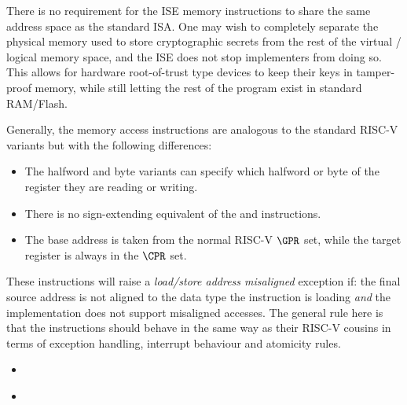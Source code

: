 There is no requirement for the ISE memory instructions to share the same
address space as the standard ISA. One may wish to completely separate
the physical memory used to store cryptographic secrets from the rest of
the virtual / logical memory space, and the ISE does not stop implementers
from doing so. This allows for hardware root-of-trust type devices to keep
their keys in tamper-proof memory, while still letting the rest of the
program exist in standard RAM/Flash.

Generally, the memory access instructions are analogous to
the standard RISC-V variants but with the following differences:

\begin{itemize}
\item The halfword and byte variants can specify which halfword or byte of
      the register they are reading or writing.
\item There is no sign-extending equivalent of the  and 
      instructions.
\item The base address is taken from the normal RISC-V $\GPR$ set, while the
      target register is always in the $\CPR$ set.
\end{itemize}

These instructions will raise a {\em load/store address misaligned} exception
if: the final source address is not aligned to the data type the instruction
is loading {\em and} the implementation does not support misaligned accesses.
The general rule here is that the  instructions should behave in
the same way as their RISC-V cousins in terms of exception handling,
interrupt behaviour and atomicity rules.


\ienc{\ienclbucr}

\begin{itemize}
\item {}
\end{itemize}


\ienc{\ienclhucr}

\begin{itemize}
\item {}
\end{itemize}


